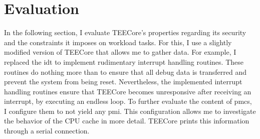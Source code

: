 \chapter{Evaluation}
\label{sec:evaluation}


In the following section, I evaluate TEECore's properties regarding its security
and the constraints it imposes on workload tasks. For this, I use a slightly
modified version of TEECore that allows me to gather data. For example, I
replaced the \gls{idt} to implement rudimentary interrupt handling routines.
These routines do nothing more than to ensure that all debug data is transferred
and prevent the system from being reset. Nevertheless, the implemented interrupt
handling routines ensure that TEECore becomes unresponsive after receiving an
interrupt, by executing an endless loop. To further evaluate the content of
\glspl{pmc}, I configure them to not yield any \gls{pmi}. This configuration
allows me to investigate the behavior of the CPU cache in more detail. TEECore
prints this information through a serial connection.

